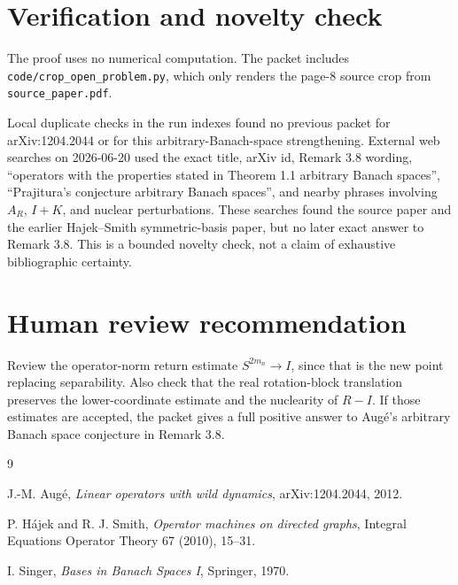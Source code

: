 \documentclass[11pt]{article}
\begin{document}
\section{Verification and novelty check}

The proof uses no numerical computation.  The packet includes
\texttt{code/crop\_open\_problem.py}, which only renders the page-8 source
crop from \texttt{source\_paper.pdf}.

Local duplicate checks in the run indexes found no previous packet for
arXiv:1204.2044 or for this arbitrary-Banach-space strengthening.  External
web searches on 2026-06-20 used the exact title, arXiv id, Remark 3.8 wording,
``operators with the properties stated in Theorem 1.1 arbitrary Banach
spaces'', ``Prajitura's conjecture arbitrary Banach spaces'', and nearby
phrases involving \(A_R\), \(I+K\), and nuclear perturbations.  These searches
found the source paper and the earlier Hajek--Smith symmetric-basis paper, but
no later exact answer to Remark 3.8.  This is a bounded novelty check, not a
claim of exhaustive bibliographic certainty.

\section{Human review recommendation}

Review the operator-norm return estimate \(S^{2m_n}\to I\), since that is the
new point replacing separability.  Also check that the real rotation-block
translation preserves the lower-coordinate estimate and the nuclearity of
\(R-I\).  If those estimates are accepted, the packet gives a full positive
answer to Aug\'e's arbitrary Banach space conjecture in Remark 3.8.

\begin{thebibliography}{9}

J.-M. Aug\'e,
\emph{Linear operators with wild dynamics},
arXiv:1204.2044, 2012.

P. H\'ajek and R. J. Smith,
\emph{Operator machines on directed graphs},
Integral Equations Operator Theory 67 (2010), 15--31.

I. Singer,
\emph{Bases in Banach Spaces I},
Springer, 1970.

\end{thebibliography}
\end{document}
